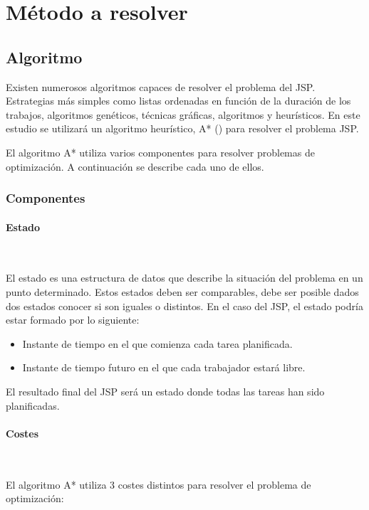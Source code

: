 \section{Método a resolver}

\subsection{Algoritmo}

Existen numerosos algoritmos capaces de resolver el problema del JSP.
Estrategias más simples como listas ordenadas en función de la duración
de los trabajos, algoritmos genéticos, técnicas gráficas,
algoritmos  y heurísticos.
En este estudio se utilizará un algoritmo heurístico, A* () \cite{HNR68}
para resolver el problema JSP.

El algoritmo A* utiliza varios componentes para resolver problemas
de optimización. A continuación se describe cada uno de ellos.

\subsubsection{Componentes}

\paragraph{Estado}~

El estado es una estructura de datos que describe la situación
del problema en un punto determinado.
Estos estados deben ser comparables,
debe ser posible dados dos estados conocer si son iguales o distintos.
En el caso del JSP, el estado podría estar formado por lo siguiente:

\begin{itemize}[itemsep=0.25px]
    \item Instante de tiempo en el que comienza cada tarea planificada.
    \item Instante de tiempo futuro en el que cada trabajador estará libre.
\end{itemize}

El resultado final del JSP será un estado donde todas las tareas han sido planificadas.

\paragraph{Costes}~

El algoritmo A* utiliza 3 costes distintos para resolver el problema de optimización:

